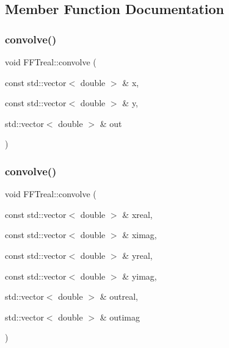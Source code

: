 \subsection{Member Function Documentation}
\mbox{\label{class_f_f_treal_a8c7ae7505d1c80b4471a30585801d64b}} 
\subsubsection{\texorpdfstring{convolve()}{convolve()}\hspace{0.1cm}{\footnotesize\ttfamily [1/2]}}
{\footnotesize\ttfamily void F\+F\+Treal\+::convolve (\begin{DoxyParamCaption}\item[{const std\+::vector$<$ double $>$ \&}]{x,  }\item[{const std\+::vector$<$ double $>$ \&}]{y,  }\item[{std\+::vector$<$ double $>$ \&}]{out }\end{DoxyParamCaption})}

\mbox{\label{class_f_f_treal_a375983c9725f461611341061dbdcc92f}} 
\subsubsection{\texorpdfstring{convolve()}{convolve()}\hspace{0.1cm}{\footnotesize\ttfamily [2/2]}}
{\footnotesize\ttfamily void F\+F\+Treal\+::convolve (\begin{DoxyParamCaption}\item[{const std\+::vector$<$ double $>$ \&}]{xreal,  }\item[{const std\+::vector$<$ double $>$ \&}]{ximag,  }\item[{const std\+::vector$<$ double $>$ \&}]{yreal,  }\item[{const std\+::vector$<$ double $>$ \&}]{yimag,  }\item[{std\+::vector$<$ double $>$ \&}]{outreal,  }\item[{std\+::vector$<$ double $>$ \&}]{outimag }\end{DoxyParamCaption})}

\mbox{\label{class_f_f_treal_a1db8c322c9e02acf725f5599c8924d0a}} 

